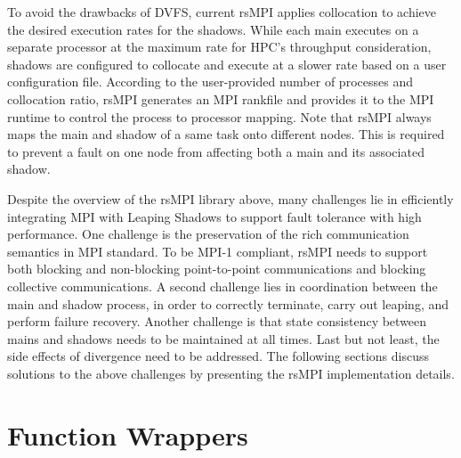 
To avoid the drawbacks of DVFS, current rsMPI applies collocation to achieve the desired execution rates for the shadows. 
While each main executes on a separate processor at the maximum rate for HPC's throughput consideration, shadows are configured to collocate and execute at a slower rate based on a user configuration file. According to the user-provided number of processes and collocation ratio, rsMPI generates an MPI rankfile and provides it to the MPI runtime to control the process to processor mapping. Note that rsMPI always maps the main and shadow of a same task onto different nodes. This is required to prevent a fault on one node from affecting  both a main and its associated  shadow.


Despite the overview of the rsMPI library above, many challenges lie in efficiently integrating MPI with Leaping Shadows to support fault tolerance with high performance. One challenge is the preservation of the rich communication semantics in MPI standard. To be MPI-1 compliant, rsMPI needs to support both blocking and non-blocking point-to-point communications and blocking collective communications. A second challenge lies in coordination between the main and shadow process, in order to correctly terminate, carry out leaping, and perform failure recovery. Another challenge is that state consistency between mains and shadows needs to be maintained at all times. Last but not least, the side effects of divergence need to be addressed. %
The following sections discuss solutions to the above challenges by presenting the rsMPI implementation details. 

\section{Function Wrappers}

